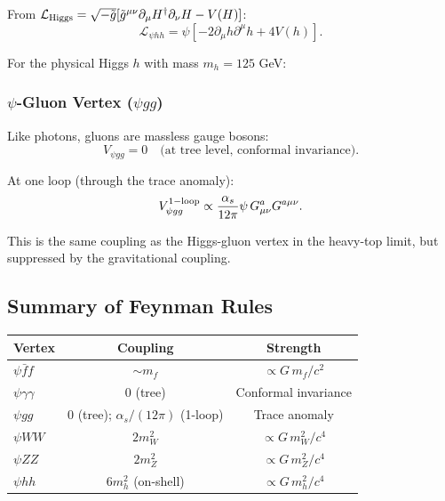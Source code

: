 \documentclass[11pt,a4paper]{article}
\begin{document}
From $\mathcal{L}_{\rm Higgs} = \sqrt{-\tilde{g}}[\tilde{g}^{\mu\nu}\partial_\mu H^\dagger\partial_\nu H - V(H)]$:
\begin{equation}
\mathcal{L}_{\psi hh} = \psi\left[-2\partial_\mu h\partial^\mu h + 4V(h)\right].
\end{equation}

For the physical Higgs $h$ with mass $m_h = 125$ GeV:
\begin{center}
\end{center}

\subsubsection{$\psi$-Gluon Vertex ($\psi g g$)}

Like photons, gluons are massless gauge bosons:
\begin{equation}
V_{\psi gg} = 0 \quad\text{(at tree level, conformal invariance)}.
\end{equation}

At one loop (through the trace anomaly):
\begin{equation}
V_{\psi gg}^{\rm 1-loop} \propto \frac{\alpha_s}{12\pi}\psi\,G_{\mu\nu}^a G^{a\mu\nu}.
\end{equation}

This is the same coupling as the Higgs-gluon vertex in the heavy-top limit, but suppressed by the gravitational coupling.

\subsection{Summary of Feynman Rules}

\begin{center}
\begin{tabular}{lcc}
\toprule
\textbf{Vertex} & \textbf{Coupling} & \textbf{Strength} \\
\midrule
$\psi\bar f f$ & $\sim m_f$ & $\propto G\,m_f/c^2$ \\
$\psi\gamma\gamma$ & 0 (tree) & Conformal invariance \\
$\psi gg$ & 0 (tree); $\alpha_s/(12\pi)$ (1-loop) & Trace anomaly \\
$\psi WW$ & $2m_W^2$ & $\propto G\,m_W^2/c^4$ \\
$\psi ZZ$ & $2m_Z^2$ & $\propto G\,m_Z^2/c^4$ \\
$\psi hh$ & $6m_h^2$ (on-shell) & $\propto G\,m_h^2/c^4$ \\
\bottomrule
\end{tabular}
\end{center}
\end{document}
